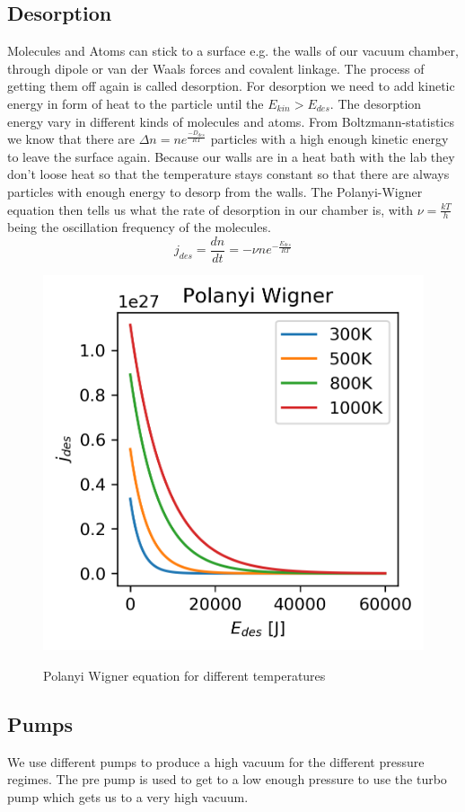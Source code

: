 \documentclass[]{article}
\begin{document}
\subsection{Desorption}
Molecules and Atoms can stick to a surface e.g. the walls of our vacuum chamber, through dipole or van der Waals forces and covalent linkage. The process of getting them off again is called desorption. For desorption we need to add kinetic energy in form of heat to the particle until the $E_{kin}>E_{des}$. The desorption energy vary in different kinds of molecules and atoms. From Boltzmann-statistics we know that there are $\Delta n=ne^{\frac{-D_{des}}{RT}}$ particles with a high enough kinetic energy to leave the surface again. Because our walls are in a heat bath with the lab they don't loose heat so that the temperature stays constant so that there are always particles with enough energy to desorp from the walls. The Polanyi-Wigner equation then tells us what the rate of desorption in our chamber is, with $\nu=\frac{kT}{h}$ being the oscillation frequency of the molecules.\[ j_{des}=\frac{dn}{dt}=-\nu n e^{-\frac{E_{des}}{RT}} \] 
\begin{figure}[h]
	\includegraphics[width=0.7\linewidth]{"Plots/Polanyi Wigner"}
	\label{fig:polanyi}
	\caption{Polanyi Wigner equation for different temperatures}
\end{figure}


\subsection{Pumps}
We use different pumps to produce a high vacuum for the different pressure regimes. The pre pump is used to get to a low enough pressure to use the turbo pump which gets us to a very high vacuum.
\end{document}
